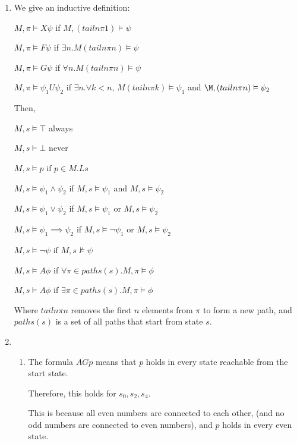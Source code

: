 


\begin{enumerate}[label=(\alph*)]

  \item
    We give an inductive definition:

    $M, \pi \vDash X \psi$ if $M, (tailn \pi 1) \vDash \psi$

    $M, \pi \vDash F \psi$ if $\exists n. M (tailn \pi n) \vDash \psi$

    $M, \pi \vDash G \psi$ if $\forall n. M (tailn \pi n) \vDash \psi$

    $M, \pi \vDash \psi_1 U \psi_2$ if $\exists n. \forall k < n$, $M (tailn \pi k) \vDash \psi_1$ and $\M, (tailn \pi n) \vDash \psi_2$

    Then,

    $M, s \vDash  \top$ always

    $M, s \vDash  \bot$ never

    $M, s \vDash p$ if $p \in M.L s$

    $M, s \vDash \psi_1 \wedge \psi_2$ if $M, s \vDash \psi_1$ and $M, s \vDash \psi_2$

    $M, s \vDash \psi_1 \vee \psi_2$ if $M, s \vDash \psi_1$ or $M, s \vDash \psi_2$

    $M, s \vDash \psi_1 \implies \psi_2$ if $M, s \vDash \neg \psi_1$ or $M, s \vDash \psi_2$

    $M, s \vDash \neg\psi$ if $M, s \not\vDash \psi$

    $M, s \vDash A \phi$ if $\forall \pi \in paths(s). M, \pi \vDash \phi$

    $M, s \vDash A \phi$ if $\exists \pi \in paths(s). M, \pi \vDash \phi$

    Where $tailn \pi n$ removes the first $n$ elements from $\pi$ to form a new path, and $paths(s)$ is a set of all paths that start from state $s$.

    \item
      \begin{enumerate}[label=(\roman*)]

        \item
          The formula $A G p$ means that $p$ holds in every state reachable from the start state.

          Therefore, this holds for $s_0, s_2, s_4$.

          This is because all even numbers are connected to each other, (and no odd numbers are connected to even numbers), and $p$ holds in every even state.


\end{enumerate}
\end{enumerate}
